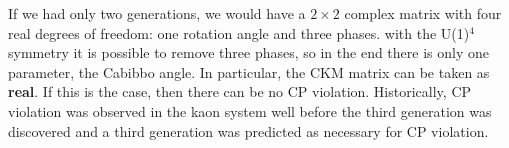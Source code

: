 \documentclass[../main.tex]{subfiles}
\begin{document}
If we had only two generations, we would have a $2\times2$ complex matrix with four real degrees of freedom: one rotation angle and three phases. with the U(1)$^4$ symmetry it is possible to remove three phases, so in the end there is only one parameter, the Cabibbo angle. In particular, the CKM matrix can be taken as \textbf{real}. If this is the case, then there can be no CP violation. Historically, CP violation was observed in the kaon system well before the third generation was discovered and a third generation was predicted as necessary for CP violation. 
\end{document}
